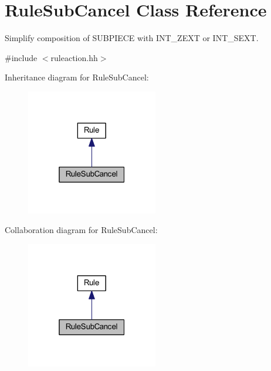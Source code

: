 \hypertarget{class_rule_sub_cancel}{}\section{Rule\+Sub\+Cancel Class Reference}
\label{class_rule_sub_cancel}


Simplify composition of S\+U\+B\+P\+I\+E\+CE with I\+N\+T\+\_\+\+Z\+E\+XT or I\+N\+T\+\_\+\+S\+E\+XT.  




{\ttfamily \#include $<$ruleaction.\+hh$>$}



Inheritance diagram for Rule\+Sub\+Cancel\+:
\nopagebreak
\begin{figure}[H]
\begin{center}
\leavevmode
\includegraphics[width=163pt]{class_rule_sub_cancel__inherit__graph}
\end{center}
\end{figure}


Collaboration diagram for Rule\+Sub\+Cancel\+:
\nopagebreak
\begin{figure}[H]
\begin{center}
\leavevmode
\includegraphics[width=163pt]{class_rule_sub_cancel__coll__graph}
\end{center}
\end{figure}
